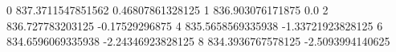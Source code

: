 0 837.3711547851562 0.46807861328125
1 836.903076171875 0.0
2 836.727783203125 -0.17529296875
4 835.5658569335938 -1.33721923828125
6 834.6596069335938 -2.24346923828125
8 834.3936767578125 -2.5093994140625
